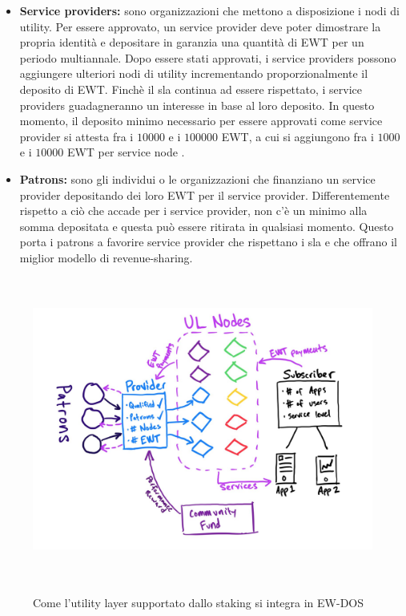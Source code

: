 \documentclass[12pt, letterpaper, twoside]{article}
\begin{document}
\begin{itemize}
    \item \textbf{Service providers:} sono organizzazioni che mettono a disposizione i nodi di utility. 
    Per essere approvato, un service provider deve poter dimostrare la propria identità e depositare in garanzia una quantità di EWT per un periodo multiannale.
    Dopo essere stati approvati, i service providers possono aggiungere ulteriori nodi di utility incrementando proporzionalmente il deposito di EWT.
    Finchè il \gls{sla} continua ad essere rispettato, i service providers guadagneranno un interesse in base al loro deposito.
    In questo momento, il deposito minimo necessario per essere approvati come service provider si attesta fra i $10000$ e i $100000$ EWT, a cui si aggiungono fra i $1000$ e i $10000$ EWT per service node \cite{art:ew-staking}.
    \item \textbf{Patrons:} sono gli individui o le organizzazioni che finanziano un service provider depositando dei loro EWT per il service provider.
    Differentemente rispetto a ciò che accade per i service provider, non c'è un minimo alla somma depositata e questa può essere ritirata in qualsiasi momento.
    Questo porta i patrons a favorire service provider che rispettano i \gls{sla} e che offrano il miglior modello di revenue-sharing.
\end{itemize}

\begin{figure}[!h]
    \includegraphics[height=10cm,keepaspectratio]{ew-staking}
    \centering
    \label{ew-staking}
    \caption{Come l'utility layer supportato dallo staking si integra in EW-DOS \cite{art:ew-staking}}
\end{figure}

\newpage
 
\printbibliography
\end{document}
